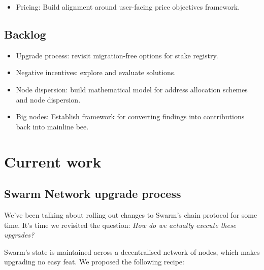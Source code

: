 \begin{itemize}
  \item Pricing: Build alignment around user-facing price objectives framework. 
\end{itemize}

\subsection*{Backlog}
\begin{itemize}
  \item Upgrade process: revisit migration-free options for stake registry.
  \item Negative incentives: explore and evaluate solutions.
  \item Node dispersion: build mathematical model for address allocation schemes and node dispersion.
  \item Big nodes: Establish framework for converting findings into contributions back into mainline bee.
\end{itemize}


\section*{Current work}

\subsection*{Swarm Network upgrade process}

We've been talking about rolling out changes to Swarm's chain protocol for some time. 
%
It's time we revisited the question: \emph{How do we actually execute these upgrades?}

Swarm's state is maintained across a decentralised network of nodes, which makes upgrading no easy feat.
%
We proposed the following recipe:


